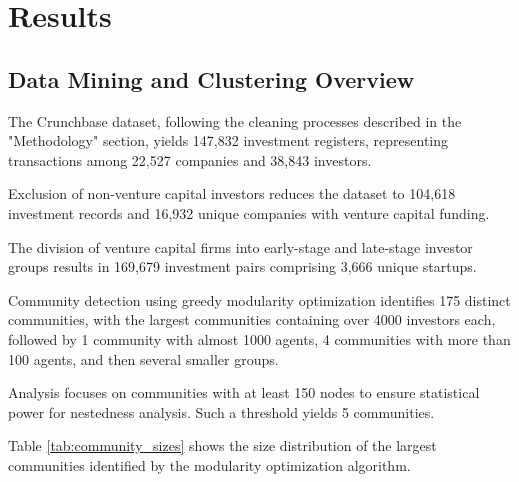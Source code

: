 \section{Results}

\subsection{Data Mining and Clustering Overview}

\newcommand{\numCompanies}{22,527}
\newcommand{\numInvestors}{38,843}
\newcommand{\numInvestments}{147,832}
\newcommand{\numFundingRounds}{268,283}

The Crunchbase dataset, following the cleaning processes described in the "Methodology" section, yields \numInvestments{} investment registers, representing transactions among \numCompanies{} companies and \numInvestors{} investors.


\newcommand{\numVCInvestments}{104,618}
\newcommand{\numCompaniesWithVCFund}{16,932}

Exclusion of non-venture capital investors reduces the dataset to \numVCInvestments{} investment records and \numCompaniesWithVCFund{} unique companies with venture capital funding.

\newcommand{\invPairs}{169,679}
\newcommand{\invPairsUniqueStartups}{3,666}

The division of venture capital firms into early-stage and late-stage investor groups results in \invPairs{} investment pairs comprising \invPairsUniqueStartups{} unique startups.


\newcommand{\numCommunities}{175}
\newcommand{\numTopCommunities}{5}
\newcommand{\numCommunitiesThreshold}{150}

Community detection using greedy modularity optimization identifies \numCommunities{} distinct communities, with the largest communities containing over 4000 investors each, followed by 1 community with almost 1000 agents, 4 communities with more than 100 agents, and then several smaller groups.

Analysis focuses on communities with at least \numCommunitiesThreshold{} nodes to ensure statistical power for nestedness analysis. Such a threshold yields \numTopCommunities{} communities.

Table \ref{tab:community_sizes} shows the size distribution of the largest communities identified by the modularity optimization algorithm.

